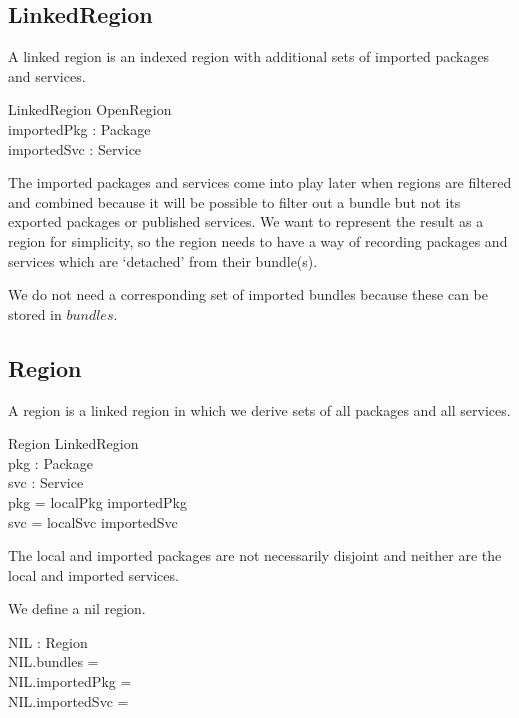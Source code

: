 \documentclass[a4paper,9pt]{article}
\begin{document}
\subsection{LinkedRegion}

A linked region is an indexed region with additional sets of imported packages and services.

\begin{schema}{LinkedRegion}
  OpenRegion \\
  importedPkg : \power Package \\
  importedSvc : \power Service \\  
\end{schema}
The imported packages and services come into play later when regions are filtered and combined
because it will be possible to filter out a bundle but not its exported packages or published services.
We want to represent the result as a region for simplicity, so the region needs to have a way
of recording packages and services which are `detached' from their bundle(s).

We do not need a corresponding set of imported bundles because these can be stored in $bundles$.

\subsection{Region}

A region is a linked region in which we derive sets of all packages and all services.
\begin{schema}{Region}
  LinkedRegion \\
  pkg : \power Package \\
  svc : \power Service \\
\where
  pkg = localPkg \cup importedPkg \\
  svc = localSvc \cup importedSvc \\
\end{schema}
The local and imported packages are not necessarily disjoint and neither are the local and imported
services.

We define a nil region.
\begin{axdef}
  NIL : Region \\
\where
 NIL.bundles = \emptyset \\
 NIL.importedPkg = \emptyset \\
 NIL.importedSvc = \emptyset \\
 \end{axdef}
\end{document}
